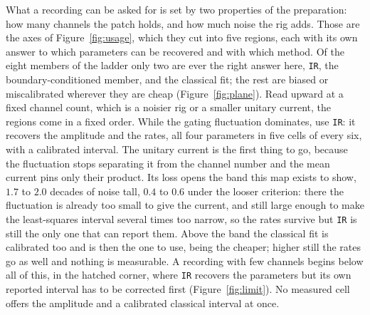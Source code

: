 What a recording can be asked for is set by two properties of the preparation: how many channels
the patch holds, and how much noise the rig adds. Those are the axes of Figure~\ref{fig:usage},
which they cut into five regions, each with its own answer to which parameters can be recovered
and with which method. Of the eight members of the ladder only two are ever the right answer here,
\texttt{IR}, the boundary-conditioned member, and the classical fit; the rest are biased or
miscalibrated wherever they are cheap (Figure~\ref{fig:plane}). Read upward at a fixed channel
count, which is a noisier rig or a smaller unitary current, the regions come in a fixed order.
While the gating fluctuation dominates, use \texttt{IR}: it recovers the amplitude and the rates,
all four parameters in five cells of every six, with a calibrated interval. The unitary current is
the first thing to go, because the fluctuation stops separating it from the channel number and the
mean current pins only their product. Its loss opens the band this map exists to show, $1.7$ to $2.0$ decades of noise tall, $0.4$ to $0.6$ under the looser criterion: there the fluctuation is already too small to give the current, and still
large enough to make the least-squares interval several times too narrow, so the rates survive but
\texttt{IR} is still the only one that can report them. Above the band the classical fit is
calibrated too and is then the one to use, being the cheaper; higher still the rates go as well
and nothing is measurable. A recording with few channels begins below all of this, in the hatched
corner, where \texttt{IR} recovers the parameters but its own reported interval has to be
corrected first (Figure~\ref{fig:limit}). No measured cell offers the amplitude and a calibrated
classical interval at once.

